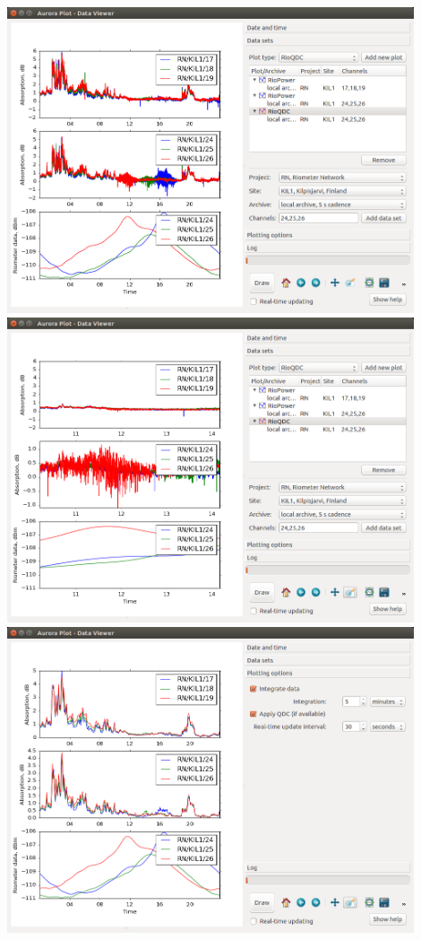 \documentclass{article}
\begin{document}
\includegraphics[width=12cm]{images/dv-3.png}
\includegraphics[width=12cm]{images/dv-4.png}
\includegraphics[width=12cm]{images/dv-5.png}
\end{document}
